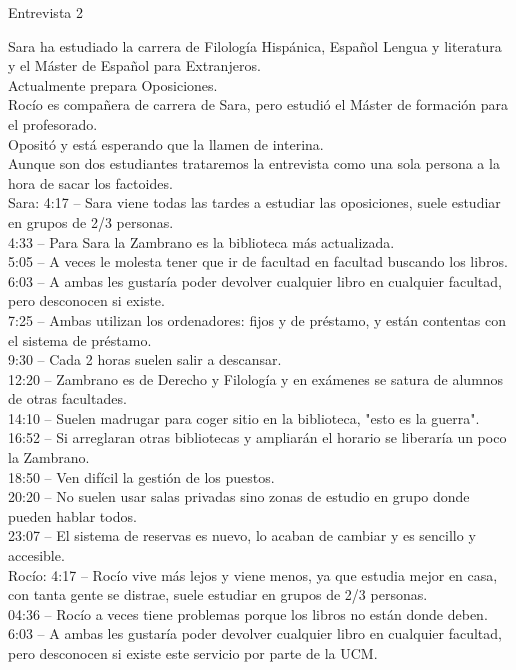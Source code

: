 \documentclass[12pt]{article}
\begin{document}
Entrevista 2

Sara ha estudiado la carrera de Filología Hispánica, Español Lengua y literatura y el Máster de Español para Extranjeros.\\ Actualmente prepara Oposiciones.\\
Rocío es compañera de carrera de Sara, pero estudió el Máster de formación para el profesorado.\\ Opositó y está esperando que la llamen de interina.\\
Aunque son dos estudiantes trataremos la entrevista como una sola persona a la hora de sacar los factoides.\\ 
Sara: 
4:17 – Sara viene todas las tardes a estudiar las oposiciones, suele estudiar en grupos de 2/3 personas.\\
4:33 – Para Sara la Zambrano es la biblioteca más actualizada.\\
5:05 – A veces le molesta tener que ir de facultad en facultad buscando los libros.\\
6:03 – A ambas les gustaría poder devolver cualquier libro en cualquier facultad, pero desconocen si existe.\\
7:25 – Ambas utilizan los ordenadores: fijos y de préstamo, y están contentas con el sistema de préstamo.\\
9:30 – Cada 2 horas suelen salir a descansar.\\
12:20 – Zambrano es de Derecho y Filología y en exámenes se satura de alumnos de otras facultades.\\
14:10 – Suelen madrugar para coger sitio en la biblioteca, "esto es la guerra".\\
16:52 – Si arreglaran otras bibliotecas y ampliarán el horario se liberaría un poco la Zambrano.\\
18:50 – Ven difícil la gestión de los puestos.\\
20:20 – No suelen usar salas privadas sino zonas de estudio en grupo donde pueden hablar todos.\\
23:07 – El sistema de reservas es nuevo, lo acaban de cambiar y es sencillo y accesible.\\
Rocío:
4:17 – Rocío vive más lejos y viene menos, ya que estudia mejor en casa, con tanta gente se distrae, suele estudiar en grupos de 2/3 personas.\\
04:36 – Rocío a veces tiene problemas porque los libros no están donde deben.\\
6:03 – A ambas les gustaría poder devolver cualquier libro en cualquier facultad, pero desconocen si existe este servicio por parte de la UCM.\\
\end{document}
